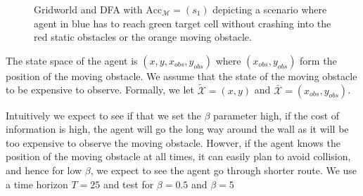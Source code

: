 \begin{figure}
{
}
\caption{Gridworld and DFA  with $\textrm{Acc}_{\mathcal{M}} = (s_1)$ depicting a scenario where agent in blue has to reach green target cell without crashing into the red static obstacles or the orange moving obstacle.}\label{fig:exp2}
\end{figure}

The state space of the agent is $(x,y,x_{obs},y_{obs})$ where $(x_{obs},y_{obs})$ form the position of the moving obstacle. We assume that the state of the moving obstacle to be expensive to observe. Formally, we let $\mathcal{\tilde{X}} = (x,y)$ and $\mathcal{\bar{X}} = (x_{obs},y_{obs})$. 

 Intuitively we expect to see if that we set the $\beta$ parameter high, \ie if the cost of information is high, the agent will go the long way around the wall as it will be too expensive to observe the moving obstacle. Howver, if the agent knows the position of the moving obstacle at all times, it can easily plan to avoid collision, and hence for low $\beta$, we expect to see the agent go through shorter route. We use a time horizon $T = 25$ and test for $\beta = 0.5$ and $\beta=5$

